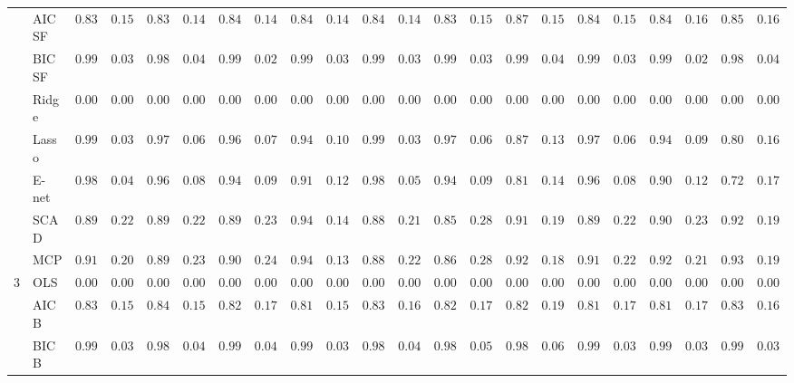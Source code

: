 \begin{tabular}{ll|ll|llllll|llllll|llllll}
 & AIC SF  & $0.8317$ & $0.1526$ & $0.8383$ & $0.1430$ & $0.8400$ & $0.1478$ & $0.8483$ & $0.1443$ & $0.8400$ & $0.1439$ & $0.8333$ & $0.1589$ & $0.8700$ & $0.1528$ & $0.8417$ & $0.1542$ & $0.8467$ & $0.1686$ & $0.8517$ & $0.1622$ \\
 & BIC SF  & $0.9917$ & $0.0365$ & $0.9867$ & $0.0454$ & $0.9950$ & $0.0286$ & $0.9933$ & $0.0328$ & $0.9917$ & $0.0365$ & $0.9900$ & $0.0398$ & $0.9917$ & $0.0435$ & $0.9933$ & $0.0328$ & $0.9950$ & $0.0286$ & $0.9883$ & $0.0427$ \\
 & Ridge  & $0.0000$ & $0.0000$ & $0.0000$ & $0.0000$ & $0.0000$ & $0.0000$ & $0.0000$ & $0.0000$ & $0.0000$ & $0.0000$ & $0.0000$ & $0.0000$ & $0.0000$ & $0.0000$ & $0.0000$ & $0.0000$ & $0.0000$ & $0.0000$ & $0.0000$ & $0.0000$ \\
 & Lasso  & $0.9933$ & $0.0328$ & $0.9783$ & $0.0611$ & $0.9633$ & $0.0771$ & $0.9400$ & $0.1073$ & $0.9917$ & $0.0365$ & $0.9733$ & $0.0658$ & $0.8700$ & $0.1373$ & $0.9783$ & $0.0697$ & $0.9433$ & $0.0983$ & $0.8000$ & $0.1658$ \\
 & E-net  & $0.9850$ & $0.0479$ & $0.9633$ & $0.0840$ & $0.9433$ & $0.0954$ & $0.9150$ & $0.1219$ & $0.9867$ & $0.0512$ & $0.9467$ & $0.0944$ & $0.8100$ & $0.1461$ & $0.9600$ & $0.0890$ & $0.9067$ & $0.1283$ & $0.7250$ & $0.1731$ \\
 & SCAD  & $0.8900$ & $0.2275$ & $0.8900$ & $0.2275$ & $0.8950$ & $0.2353$ & $0.9417$ & $0.1429$ & $0.8833$ & $0.2178$ & $0.8533$ & $0.2845$ & $0.9183$ & $0.1989$ & $0.8967$ & $0.2232$ & $0.9017$ & $0.2310$ & $0.9267$ & $0.1972$ \\
 & MCP  & $0.9117$ & $0.2002$ & $0.8983$ & $0.2308$ & $0.9000$ & $0.2439$ & $0.9450$ & $0.1320$ & $0.8867$ & $0.2271$ & $0.8650$ & $0.2810$ & $0.9217$ & $0.1827$ & $0.9133$ & $0.2216$ & $0.9233$ & $0.2189$ & $0.9333$ & $0.1925$ \\\hline
3 & OLS  & $0.0000$ & $0.0000$ & $0.0000$ & $0.0000$ & $0.0000$ & $0.0000$ & $0.0000$ & $0.0000$ & $0.0000$ & $0.0000$ & $0.0000$ & $0.0000$ & $0.0000$ & $0.0000$ & $0.0000$ & $0.0000$ & $0.0000$ & $0.0000$ & $0.0000$ & $0.0000$ \\
 & AIC B  & $0.8317$ & $0.1526$ & $0.8450$ & $0.1576$ & $0.8217$ & $0.1729$ & $0.8183$ & $0.1573$ & $0.8317$ & $0.1633$ & $0.8250$ & $0.1747$ & $0.8200$ & $0.1934$ & $0.8183$ & $0.1710$ & $0.8183$ & $0.1726$ & $0.8317$ & $0.1633$ \\
 & BIC B  & $0.9917$ & $0.0365$ & $0.9883$ & $0.0489$ & $0.9900$ & $0.0463$ & $0.9950$ & $0.0371$ & $0.9883$ & $0.0427$ & $0.9850$ & $0.0535$ & $0.9850$ & $0.0631$ & $0.9933$ & $0.0328$ & $0.9917$ & $0.0365$ & $0.9917$ & $0.0365$ \\

\end{tabular}
